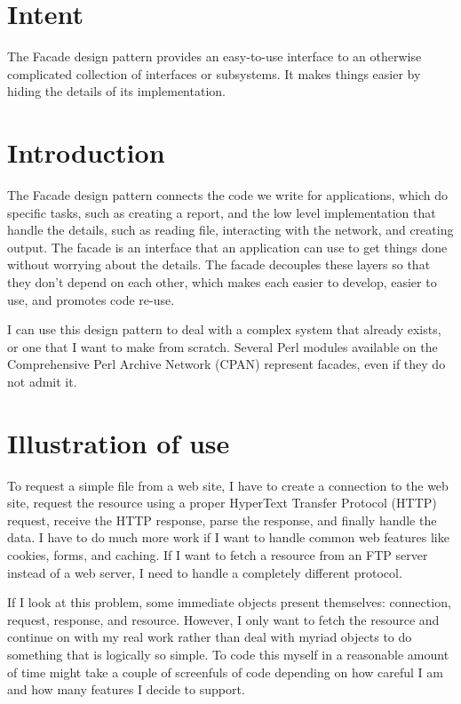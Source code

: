 
	\section{Intent}
	
The Facade design pattern provides an easy-to-use interface to an
otherwise complicated collection of interfaces or subsystems.  It
makes things easier by hiding the details of its implementation.

	
	\section{Introduction}
	
The Facade design pattern connects the code we write for applications,
which do specific tasks, such as creating a report, and the low level
implementation that handle the details, such as reading file,
interacting with the network, and creating output.  The facade is
an interface that an application can use to get things done without
worrying about the details.  The facade decouples these layers
so that they don't depend on each other, which makes each easier
to develop, easier to use, and promotes code re-use.

I can use this design pattern to deal with a complex system that
already exists, or one that I want to make from scratch. Several
Perl modules available on the Comprehensive Perl Archive Network
(CPAN) represent facades, even if they do not admit it.

	\section{Illustration of use}
	
To request a simple file from a web site, I have to create a
connection to the web site, request the resource using a proper
HyperText Transfer Protocol (HTTP) request, receive the HTTP response,
parse the response, and finally handle the data.  I have to do much
more work if I want to handle common web features like cookies, forms,
and caching. If I want to fetch a resource from an FTP server instead
of a web server, I  need to handle a completely different protocol.

If I look at this problem, some immediate objects present themselves:
connection, request, response, and resource.  However, I only want to
fetch the resource and continue on with my real work rather than deal
with myriad objects to do something that is logically so simple. To
code this myself in a reasonable amount of time might take a couple of
screenfuls of code depending on how careful I am and how many features
I decide to support.

